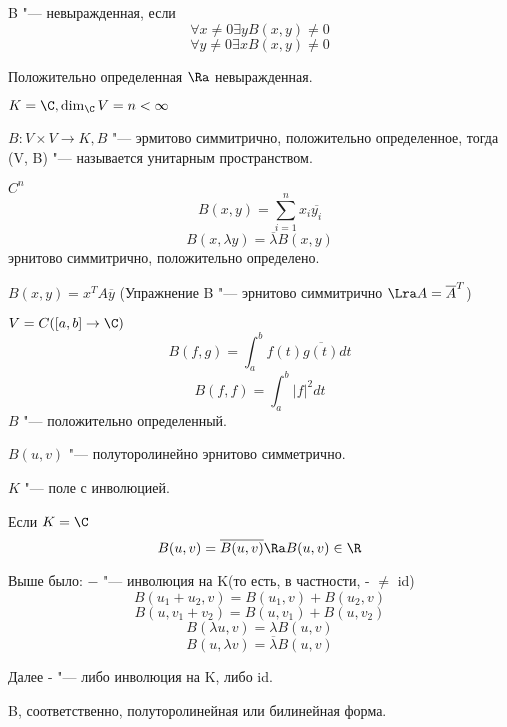 \begin{Def}
B "--- невыражденная, если 
$$\forall x \ne 0 \exists y B(x, y) \ne 0$$
$$\forall y \ne 0 \exists x B(x, y) \ne 0$$
\end{Def}

Положительно определенная $\Ra$ невыражденная.
\begin{Def}
$K = \C, \dim_{\C}V = n < \infty$

$B \colon V \times V \to K, B$ "--- эрмитово симмитрично, положительно определенное,
тогда (V, B) "--- называется унитарным пространством. 
\end{Def}

\begin{exmp}
\item $C^n$
 $$B(x, y) = \sum_{i = 1}^{n}x_i\overline{y_i}$$
 $$B(x, \lambda y) = \overline{\lambda}B(x, y)$$
 эрнитово симмитрично, положительно определено.
\item $B(x, y) = x^{T}A\overline{y}$
(Упражнение B "--- эрнитово  симмитрично $\Lra A  = \overline{A}^{T}$)
\item $V = C([a, b] \to \C)$
$$B(f, g) = \int_{a}^{b}f(t)\overline{g(t)}dt$$  
$$B(f, f) = \int_{a}^{b}|f|^2dt$$
$B$ "--- положительно определенный. 
\end{exmp}

$B(u, v)$ "--- полуторолинейно эрнитово симметрично.

$K$ "--- поле с инволюцией.

Если $K = \C$
$$B(u, v) = \overline{B(u, v)} \Ra B(u, v) \in \R$$ 

Выше было: $-$ "--- инволюция на K(то есть, в частности, - $\ne$ id)
$$B(u_1 + u_2, v) = B(u_1, v) + B(u_2, v)$$
$$B(u, v_1 + v_2) = B(u, v_1) + B(u, v_2)$$
$$B(\lambda u, v) = \lambda B(u, v)$$
$$B(u, \lambda v) = \overline{\lambda} B(u, v)$$

Далее - "--- либо инволюция на K, либо id.

B, соответственно, полуторолинейная или билинейная форма.